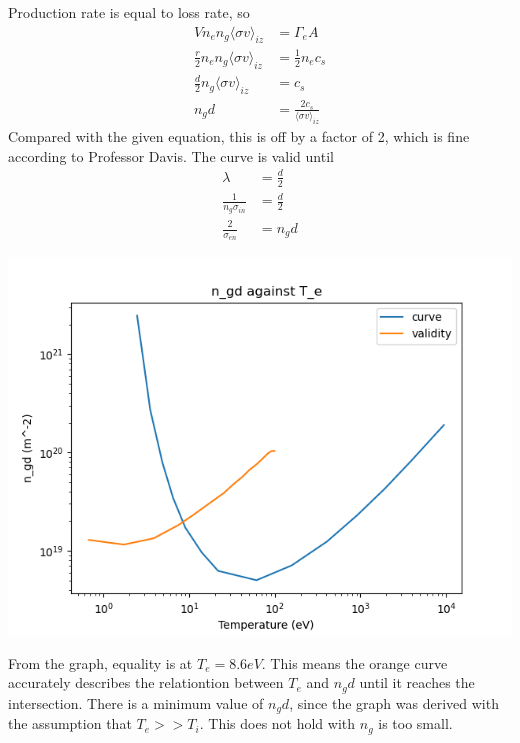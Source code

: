 \documentclass[answers]{exam}
\begin{document}
\begin{questions}
\begin{parts}
\begin{solution}
    Production rate is equal to loss rate, so
    \begin{align*}
        Vn_en_g\langle \sigma v\rangle_{iz} &= \Gamma_e A \\
        \frac{r}{2}n_en_g \langle \sigma v \rangle_{iz} &= \frac{1}{2} n_e c_s \\
        \frac{d}{2} n_g \langle \sigma v \rangle_{iz} &= c_s \\
        n_gd &= \frac{2c_s}{\langle \sigma v \rangle_{iz}}
    \end{align*}
    Compared with the given equation, this is off by a factor of 2, which is fine according to Professor Davis.
    The curve is valid until
    \begin{align*}
        \lambda &= \frac{d}{2} \\
        \frac{1}{n_g\sigma_{in}} &= \frac{d}{2} \\
        \frac{2}{\sigma_{en}} &= n_gd
    \end{align*}
    \begin{center}
    \includegraphics[scale=0.5]{q2a.png} \\
    \end{center}
    From the graph, equality is at $T_e = 8.6 \unit{eV}$. This means the orange curve accurately describes the relationtion between $T_e$ and $n_gd$ until it reaches the intersection. There is a minimum value of $n_gd$, since the graph was derived with the assumption that $T_e >> T_i$. This does not hold with $n_g$ is too small.
\end{solution}



\end{parts}
\end{questions}
\end{document}
